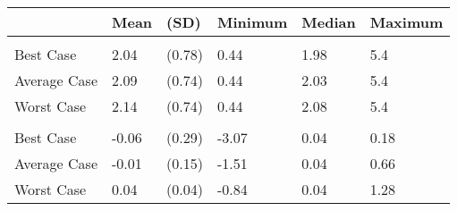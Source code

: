 
\begin{tabular}[t]{llllll}
\toprule
 & Mean & (SD) & Minimum & Median & Maximum\\
\midrule
\addlinespace[0.3em]
\multicolumn{6}{l}{\textbf{Prices}}\\
\hspace{1em}Best Case & 2.04 & (0.78) & 0.44 & 1.98 & 5.4\\
\hspace{1em}Average Case & 2.09 & (0.74) & 0.44 & 2.03 & 5.4\\
\hspace{1em}Worst Case & 2.14 & (0.74) & 0.44 & 2.08 & 5.4\\
\addlinespace[0.3em]
\multicolumn{6}{l}{\textbf{Price Change}}\\
\hspace{1em}Best Case & -0.06 & (0.29) & -3.07 & 0.04 & 0.18\\
\hspace{1em}Average Case & -0.01 & (0.15) & -1.51 & 0.04 & 0.66\\
\hspace{1em}Worst Case & 0.04 & (0.04) & -0.84 & 0.04 & 1.28\\
\bottomrule
\end{tabular}
